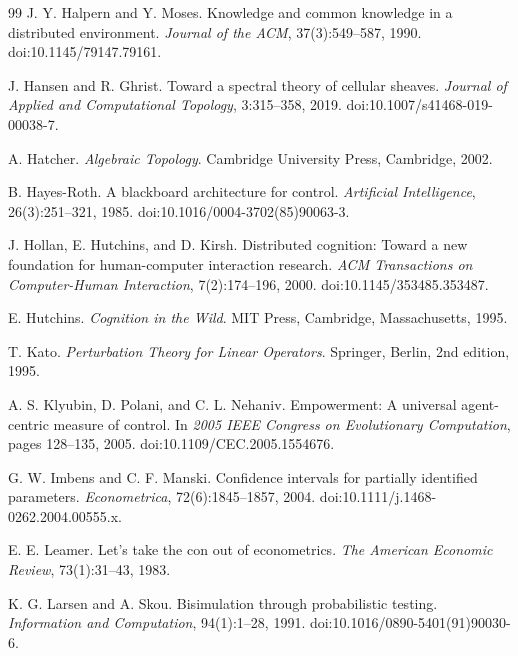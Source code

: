 \begin{thebibliography}{99}
J. Y. Halpern and Y. Moses.
\newblock Knowledge and common knowledge in a distributed environment.
\newblock \emph{Journal of the ACM}, 37(3):549--587, 1990.
\newblock doi:10.1145/79147.79161.

J. Hansen and R. Ghrist.
\newblock Toward a spectral theory of cellular sheaves.
\newblock \emph{Journal of Applied and Computational Topology}, 3:315--358, 2019.
\newblock doi:10.1007/s41468-019-00038-7.

A. Hatcher.
\newblock \emph{Algebraic Topology}.
\newblock Cambridge University Press, Cambridge, 2002.

B. Hayes-Roth.
\newblock A blackboard architecture for control.
\newblock \emph{Artificial Intelligence}, 26(3):251--321, 1985.
\newblock doi:10.1016/0004-3702(85)90063-3.

J. Hollan, E. Hutchins, and D. Kirsh.
\newblock Distributed cognition: Toward a new foundation for human-computer interaction research.
\newblock \emph{ACM Transactions on Computer-Human Interaction}, 7(2):174--196, 2000.
\newblock doi:10.1145/353485.353487.

E. Hutchins.
\newblock \emph{Cognition in the Wild}.
\newblock MIT Press, Cambridge, Massachusetts, 1995.

T. Kato.
\newblock \emph{Perturbation Theory for Linear Operators}.
\newblock Springer, Berlin, 2nd edition, 1995.

A. S. Klyubin, D. Polani, and C. L. Nehaniv.
\newblock Empowerment: A universal agent-centric measure of control.
\newblock In \emph{2005 IEEE Congress on Evolutionary Computation}, pages 128--135, 2005.
\newblock doi:10.1109/CEC.2005.1554676.

G. W. Imbens and C. F. Manski.
\newblock Confidence intervals for partially identified parameters.
\newblock \emph{Econometrica}, 72(6):1845--1857, 2004.
\newblock doi:10.1111/j.1468-0262.2004.00555.x.

E. E. Leamer.
\newblock Let's take the con out of econometrics.
\newblock \emph{The American Economic Review}, 73(1):31--43, 1983.

K. G. Larsen and A. Skou.
\newblock Bisimulation through probabilistic testing.
\newblock \emph{Information and Computation}, 94(1):1--28, 1991.
\newblock doi:10.1016/0890-5401(91)90030-6.


\end{thebibliography}
